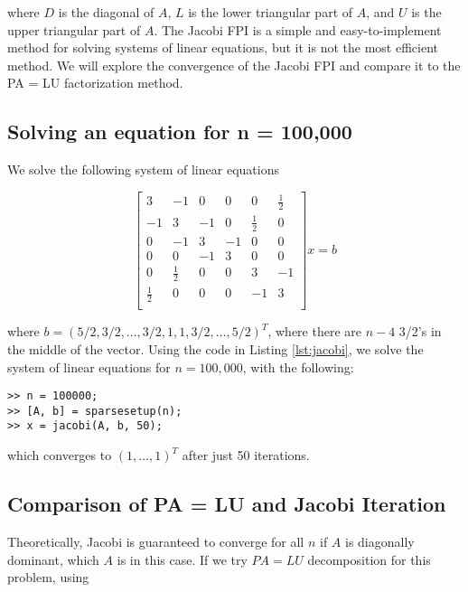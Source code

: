 \documentclass[11pt]{article}
\begin{document}
where $D$ is the diagonal of $A$, $L$ is the lower triangular part of $A$, and $U$ is the upper triangular part of $A$. The Jacobi FPI is a simple and easy-to-implement method for solving systems of linear equations, but it is not the most efficient method. We will explore the convergence of the Jacobi FPI and compare it to the PA = LU factorization method.

\subsection{Solving an equation for n = 100,000}

We solve the following system of linear equations

\begin{equation}
\begin{bmatrix}
  3 & -1 & 0 & 0 & 0 & \frac{1}{2} \\
  -1 & 3 & -1 & 0 & \frac{1}{2} & 0 \\
  0 & -1 & 3 & -1 & 0 & 0 \\
  0 & 0 & -1 & 3 & 0 & 0 \\
  0 & \frac{1}{2} & 0 & 0 & 3 & -1 \\
  \frac{1}{2} & 0 & 0 & 0 & -1 & 3 \\
\end{bmatrix}x = b
\end{equation}

where $b = (5/2, 3/2, \dots, 3/2, 1, 1, 3/2, \dots, 5/2)^T$, where there are $n - 4$ 3/2's in the middle of the vector. Using the code in Listing \ref{lst:jacobi}, we solve the system of linear equations for $n = 100,000$, with the following:

\begin{verbatim}
>> n = 100000;
>> [A, b] = sparsesetup(n);
>> x = jacobi(A, b, 50);
\end{verbatim}

which converges to $(1, \dots, 1)^T$ after just 50 iterations.





\subsection{Comparison of PA = LU and Jacobi Iteration}

Theoretically, Jacobi is guaranteed to converge for all $n$ if $A$ is diagonally dominant, which $A$ is in this case. If we try $PA = LU$ decomposition for this problem, using
\end{document}
